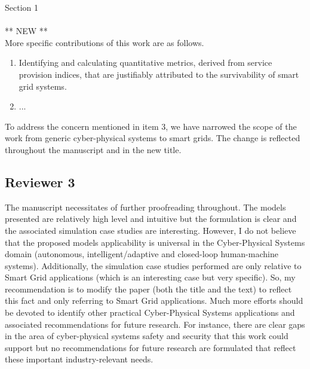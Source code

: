 \documentclass{article}
\newenvironment{response}{
  \doublespacing
  \setlength\parindent{0.05\linewidth}
  \ttfamily
}{}
\newenvironment{textblock}[1]
{\begin{tcolorbox}[breakable,enhanced]{#1 \\ \\}}
{\end{tcolorbox}}
\begin{document}
\begin{response}
\begin{textblock}{Section 1}
\vspace{1em}
** NEW **\\
More specific contributions of this work are as follows.

\begin{enumerate}
  \item Identifying and calculating quantitative metrics, derived from service provision indices, that are justifiably attributed to the survivability of smart grid systems.
  \item ...
\end{enumerate}
\end{textblock}

To address the concern mentioned in item 3, we have narrowed the scope of the work from generic cyber-physical systems to smart grids. The change is reflected throughout the manuscript and in the new title.

\end{response}

\subsection{Reviewer 3}
\label{sec:reviewer:r3}
The manuscript necessitates of further proofreading throughout. The models presented are relatively high level and intuitive but the formulation is clear and the associated simulation case studies are interesting. However, I do not believe that the proposed models applicability is universal in the Cyber-Physical Systems domain (autonomous, intelligent/adaptive and closed-loop human-machine systems). Additionally, the simulation case studies performed are only relative to Smart Grid applications (which is an interesting case but very specific). So, my recommendation is to modify the paper (both the title and the text) to reflect this fact and only referring to Smart Grid applications. Much more efforts should be devoted to identify other practical Cyber-Physical Systems applications and associated recommendations for future research. For instance, there are clear gaps in the area of cyber-physical systems safety and security that this work could support but no recommendations for future research are formulated that reflect these important industry-relevant needs.
\end{document}
